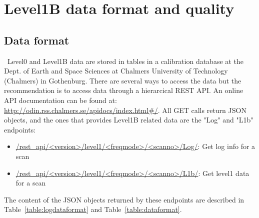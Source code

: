 
\chapter{Level1B data format and quality}


\section{Data format}

\smr\ Level0 and Level1B data are stored in tables
in a calibration database at the Dept. of Earth and Space
Sciences at Chalmers University of Technology (Chalmers) in Gothenburg.
There are several ways to access the data but the recommendation is to access
data through a hierarcical REST API. An online API documentation can be found at:
\url{http://odin.rss.chalmers.se/apidocs/index.html#/}.
All GET calls return JSON objects, and the ones that provides Level1B
related data are the "Log" and "L1b" endpoints:

\begin{itemize}
    \item \url{/rest_api/<version>/level1/<freqmode>/<scanno>/Log/}: Get log info for a scan
    \item \url{/rest_api/<version>/level1/<freqmode>/<scanno>/L1b/}: Get level1 data for a scan
\end{itemize}

The content of the JSON objects returned by these endpoints are described in
Table~\ref{table:logdataformat} and Table~\ref{table:dataformat}.

